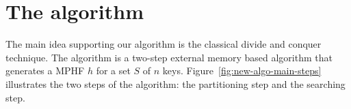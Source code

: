 \vspace{-3mm}
\section{The algorithm}
\label{sec:new-algorithm}
\vspace{-2mm}

\enlargethispage{2\baselineskip}
The main idea supporting our algorithm is the classical divide and conquer technique.
The algorithm is a two-step external memory based algorithm 
that generates a MPHF $h$ for a set $S$ of $n$ keys.
Figure~\ref{fig:new-algo-main-steps} illustrates the two steps of the
algorithm: the partitioning step and the searching step.

\vspace{-2mm}
